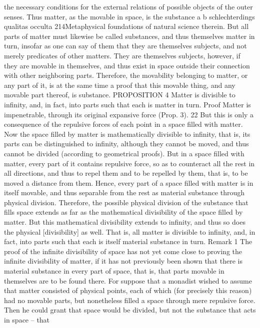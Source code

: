 the necessary conditions for the external relations of possible objects of
the outer senses. Thus matter, as the movable in space, is the substance
a
b
schlechterdings
qualitas occulta
214Metaphysical foundations of natural science
therein. But all parts of matter must likewise be called substances, and
thus themselves matter in turn, insofar as one can say of them that they
are themselves subjects, and not merely predicates of other matters. They
are themselves subjects, however, if they are movable in themselves, and
thus exist in space outside their connection with other neighboring parts.
Therefore, the movability belonging to matter, or any part of it, is at the
same time a proof that this movable thing, and any movable part thereof,
is substance.
PROPOSITION 4
Matter is divisible to inﬁnity, and, in fact, into parts such that each is matter
in turn.
Proof
Matter is impenetrable, through its original expansive force (Prop. 3). 22
But this is only a consequence of the repulsive forces of each point in a
space ﬁlled with matter. Now the space ﬁlled by matter is mathematically
divisible to inﬁnity, that is, its parts can be distinguished to inﬁnity,
although they cannot be moved, and thus cannot be divided (according
to geometrical proofs). But in a space ﬁlled with matter, every part of it
contains repulsive force, so as to counteract all the rest in all directions,
and thus to repel them and to be repelled by them, that is, to be moved
a distance from them. Hence, every part of a space ﬁlled with matter is
in itself movable, and thus separable from the rest as material substance
through physical division. Therefore, the possible physical division of the
substance that ﬁlls space extends as far as the mathematical divisibility
of the space ﬁlled by matter. But this mathematical divisibility extends
to inﬁnity, and thus so does the physical [divisibility] as well. That is,
all matter is divisible to inﬁnity, and, in fact, into parts such that each is
itself material substance in turn.
Remark 1
The proof of the inﬁnite divisibility of space has not yet come close to
proving the inﬁnite divisibility of matter, if it has not previously been
shown that there is material substance in every part of space, that is, that
parts movable in themselves are to be found there. For suppose that a
monadist wished to assume that matter consisted of physical points, each
of which (for precisely this reason) had no movable parts, but nonetheless
ﬁlled a space through mere repulsive force. Then he could grant that
space would be divided, but not the substance that acts in space – that
